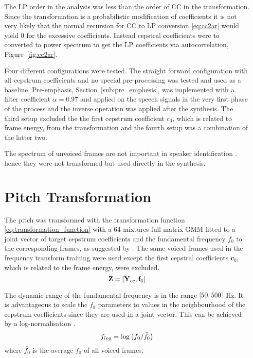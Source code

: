 The LP order in the analysis was less than the order of CC in the transformation. Since the transformation is a probabilistic modification of coefficients it is not very likely that the normal recursion for CC to LP conversion \eqref{eq:cc2ar} would yield 0 for the excessive coefficients. Instead cepstral coefficients were to converted to power spectrum to get the LP coefficients via autocorrelation, Figure~\ref{fig:cc2ar}.

Four different configurations were tested. The straight forward configuration with all cepstrum coefficients and no special pre-processing was tested and used as a baseline. Pre-emphasis, Section~\ref{sub:pre_emphesis}, was implemented with a filter coefficient $\alpha=0.97$ and applied on the speech signals in the very first phase of the process and the inverse operation was applied after the synthesis. The third setup excluded the the first cepstrum coefficient $c_0$, which is related to frame energy, from the transformation and the fourth setup was a combination of the latter two.

The spectrum of unvoiced frames are not important in speaker identification , hence they were not transformed but used directly in the synthesis.

\section{Pitch Transformation} %
\label{sec:pitch_transformation}

The pitch was transformed with the transformation function \eqref{eq:transformation_function} with a 64 mixtures full-matrix GMM fitted to a joint vector of target cepstrum coefficients and the fundamental frequency $f_0$ to the corresponding frames, as suggested by \cite{najjary03new}. The same voiced frames used in the frequency transform training were used except the first cepstral coefficients $\mathbf{c}_0$, which is related to the frame energy, were excluded. 
\begin{equation}
	\mathbf{Z} = \left[\mathbf{Y}_{cc}, \mathbf{f}_{0}\right]
\end{equation}

The dynamic range of the fundamental frequency is in the range $\left[50,500\right]$ Hz. It is advantageous to scale the $f_0$ parameters to values in the neighbourhood of the cepstrum coefficients since they are used in a joint vector. This can be achieved by a log-normalisation \cite{najjary03new}.
\begin{equation}
	f_{log} = \log \left(f_0/\bar{f_0}\right)
\end{equation}
where $\bar{f_0}$ is the average $f_0$ of all voiced frames.

